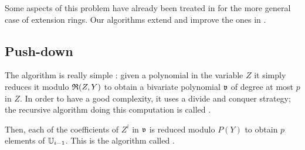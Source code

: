 Some aspects of this problem have already been treated in \cite{PS06}
for the more general case of extension rings. Our algorithms extend
and improve the ones in \cite{PS06}.

\subsection{Push-down}
\label{sec:level-embedding:push-down}
The  algorithm is really simple : given a polynomial in
the variable $Z$ it simply reduces it modulo $\mathfrak{R}(Z,Y)$ to obtain
a bivariate polynomial $\mathfrak{v}$ of degree at most $p$ in $Z$. In
order to have a good complexity, it uses a divide and conquer
strategy; the recursive algorithm doing this computation is called
.

Then, each of the coefficients of $Z^i$ in $\mathfrak{v}$ is reduced modulo
$P(Y)$ to obtain $p$ elements of $\mathbb{U}_{i-1}$. This is the algorithm
called .

